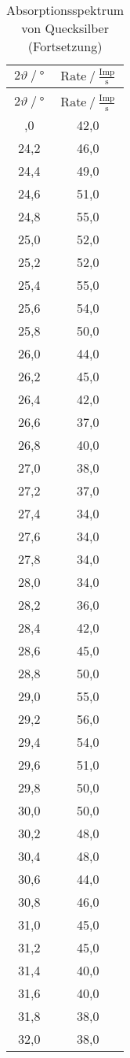 \begin{longtable}{ S S }
   \caption{Absorptionsspektrum von Quecksilber}
   \label{tab:queck} \\
    \toprule
 {$2\vartheta\:/\: \mathrm{°}$} & {$\text{Rate}\:/\: \mathrm{\frac{Imp}{s}}$} \\
    \midrule
  \endfirsthead
    \caption{Absorptionsspektrum von Quecksilber (Fortsetzung)} \\
    \toprule
 {$2\vartheta\:/\: \mathrm{°}$} & {$\text{Rate}\:/\: \mathrm{\frac{Imp}{s}}$} \\
    \midrule
  \endhead
    \midrule
  \endfoot
    \bottomrule
  ,0 & 42,0 \\
    24,2 & 46,0 \\
    24,4 & 49,0 \\
    24,6 & 51,0 \\
    24,8 & 55,0 \\
    25,0 & 52,0 \\
    25,2 & 52,0 \\
    25,4 & 55,0 \\
    25,6 & 54,0 \\
    25,8 & 50,0 \\
    26,0 & 44,0 \\
    26,2 & 45,0 \\
    26,4 & 42,0 \\
    26,6 & 37,0 \\
    26,8 & 40,0 \\
    27,0 & 38,0 \\
    27,2 & 37,0 \\
    27,4 & 34,0 \\
    27,6 & 34,0 \\
    27,8 & 34,0 \\
    28,0 & 34,0 \\
    28,2 & 36,0 \\
    28,4 & 42,0 \\
    28,6 & 45,0 \\
    28,8 & 50,0 \\
    29,0 & 55,0 \\
    29,2 & 56,0 \\
    29,4 & 54,0 \\
    29,6 & 51,0 \\
    29,8 & 50,0 \\
    30,0 & 50,0 \\
    30,2 & 48,0 \\
    30,4 & 48,0 \\
    30,6 & 44,0 \\
    30,8 & 46,0 \\
    31,0 & 45,0 \\
    31,2 & 45,0 \\
    31,4 & 40,0 \\
    31,6 & 40,0 \\
    31,8 & 38,0 \\
    32,0 & 38,0 \\
\end{longtable}
